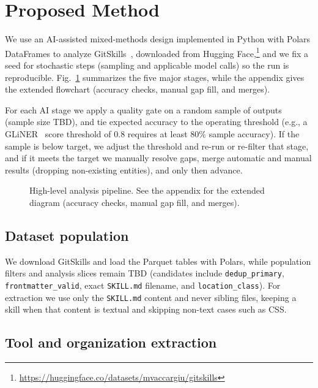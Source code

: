 \section{Proposed Method}

We use an AI-assisted mixed-methods design implemented in Python with Polars
DataFrames to analyze GitSkills~\cite{gitskills2027}, downloaded from Hugging
Face,\footnote{\url{https://huggingface.co/datasets/mvaccargiu/gitskills}}
and we fix a seed for stochastic steps (sampling and applicable model calls) so
the run is reproducible.
Fig.~\ref{fig:pipeline-simple} summarizes the five major stages, while the
appendix gives the extended flowchart (accuracy checks, manual gap fill, and
merges).

For each AI stage we apply a quality gate on a random sample of outputs (sample
size TBD), and tie expected accuracy to the operating
threshold (e.g., a GLiNER~\cite{zaratiana2023glinergeneralistmodelnamed} score threshold of $0.8$ requires at least $80\%$
sample accuracy).
If the sample is below target, we adjust the threshold and re-run or re-filter
that stage, and if it meets the target we manually resolve gaps, merge
automatic and manual results (dropping non-existing entities), and only then
advance.

\begin{figure}[!t]
  \centering
  
  \caption{High-level analysis pipeline.
    See the appendix for the extended diagram (accuracy checks, manual gap fill,
    and merges).}
  \label{fig:pipeline-simple}
\end{figure}

\subsection{Dataset population}

We download GitSkills and load the Parquet tables with Polars, while population
filters and analysis slices remain TBD (candidates include
\texttt{dedup\_primary}, \texttt{frontmatter\_valid}, exact \texttt{SKILL.md}
filename, and \texttt{location\_class}).
For extraction we use only the \texttt{SKILL.md} content and never sibling
files, keeping a skill when that content is textual and skipping non-text
cases such as CSS.

\subsection{Tool and organization extraction}

